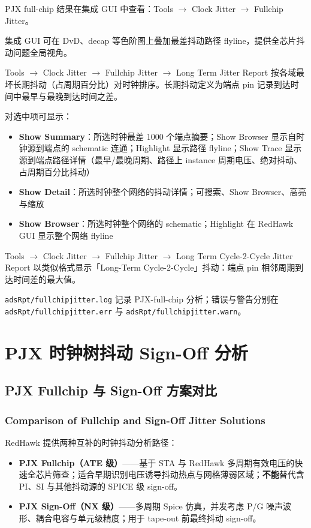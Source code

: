 PJX full-chip 结果在集成 GUI 中查看：Tools $\rightarrow$ Clock Jitter $\rightarrow$ Fullchip Jitter。

集成 GUI 可在 DvD、decap 等色阶图上叠加最差抖动路径 flyline，提供全芯片抖动问题全局视角。

Tools $\rightarrow$ Clock Jitter $\rightarrow$ Fullchip Jitter $\rightarrow$ Long Term Jitter Report 按各域最坏长期抖动（占周期百分比）对时钟排序。长期抖动定义为端点 pin 记录到达时间中最早与最晚到达时间之差。

对选中项可显示：
\begin{itemize}
  \item \textbf{Show Summary}：所选时钟最差 1000 个端点摘要；Show Browser 显示自时钟源到端点的 schematic 连通；Highlight 显示路径 flyline；Show Trace 显示源到端点路径详情（最早/最晚周期、路径上 instance 周期电压、绝对抖动、占周期百分比抖动）
  \item \textbf{Show Detail}：所选时钟整个网络的抖动详情；可搜索、Show Browser、高亮与缩放
  \item \textbf{Show Browser}：所选时钟整个网络的 schematic；Highlight 在 RedHawk GUI 显示整个网络 flyline
\end{itemize}

Tools $\rightarrow$ Clock Jitter $\rightarrow$ Fullchip Jitter $\rightarrow$ Long Term Cycle-2-Cycle Jitter Report 以类似格式显示「Long-Term Cycle-2-Cycle」抖动：端点 pin 相邻周期到达时间差的最大值。

\texttt{adsRpt/fullchipjitter.log} 记录 PJX-full-chip 分析；错误与警告分别在 \texttt{adsRpt/fullchipjitter.err} 与 \texttt{adsRpt/fullchipjitter.warn}。

\section{PJX 时钟树抖动 Sign-Off 分析}
\subsection{PJX Fullchip 与 Sign-Off 方案对比}
\subsubsection*{Comparison of Fullchip and Sign-Off Jitter Solutions}

RedHawk 提供两种互补的时钟抖动分析路径：
\begin{itemize}
  \item \textbf{PJX Fullchip（ATE 级）}——基于 STA 与 RedHawk 多周期有效电压的快速全芯片筛查；适合早期识别电压诱导抖动热点与网格薄弱区域；\textbf{不能}替代含 PI、SI 与其他抖动源的 SPICE 级 sign-off。
  \item \textbf{PJX Sign-Off（NX 级）}——多周期 Spice 仿真，并发考虑 P/G 噪声波形、耦合电容与单元级精度；用于 tape-out 前最终抖动 sign-off。
\end{itemize}

